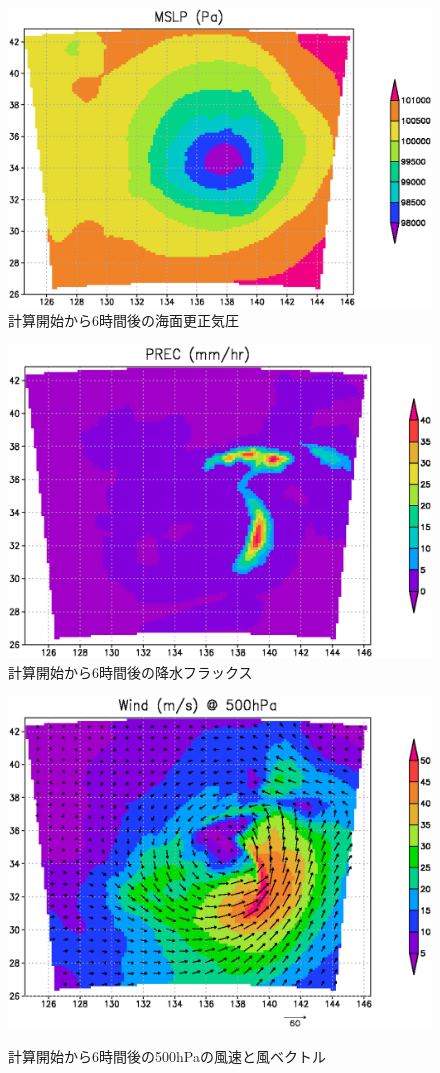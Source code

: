 \begin{figure}[h]
\begin{center}
  \includegraphics[width=0.55\hsize]{./figure/real_mslp.eps}\\
  \caption{計算開始から6時間後の海面更正気圧}
  \label{fig:real_mslp}
\end{center}
\begin{center}
  \includegraphics[width=0.55\hsize]{./figure/real_prec.eps}\\
  \caption{計算開始から6時間後の降水フラックス}
  \label{fig:real_prec}
\end{center}
\begin{center}
  \includegraphics[width=0.55\hsize]{./figure/real_wind.eps}\\
  \caption{計算開始から6時間後の500hPaの風速と風ベクトル}
  \label{fig:real_wind}
\end{center}
\end{figure}

\\
